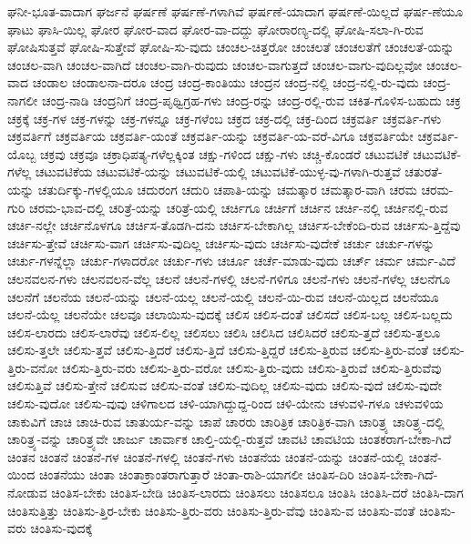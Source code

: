 {ಘನೀ-ಭೂತ-ವಾದಾಗ
ಘರ್ಜನೆ
ಘರ್ಷಣೆ
ಘರ್ಷಣೆ-ಗಳಾಗಿವೆ
ಘರ್ಷಣೆ-ಯಾದಾಗ
ಘರ್ಷಣೆ-ಯಿಲ್ಲದೆ
ಘರ್ಷ-ಣೆಯೂ
ಘಾಟು
ಘಾಸಿ-ಯಿಲ್ಲ
ಘೋರ
ಘೋರ-ವಾದ
ಘೋರ-ವಾ-ದದ್ದು
ಘೋರಾರಣ್ಯ-ದಲ್ಲಿ
ಘೋಷಿ-ಸಲಾ-ಗಿ-ರುವ
ಘೋಷಿಸುತ್ತವೆ
ಘೋಷಿ-ಸುತ್ತೇವೆ
ಘೋಷಿ-ಸು-ವುದು
ಚಂಚಲ-ಚಿತ್ತರೋ
ಚಂಚಲತೆ
ಚಂಚಲತೆಗೆ
ಚಂಚಲತೆ-ಯನ್ನು
ಚಂಚಲ-ವಾಗಿ
ಚಂಚಲ-ವಾಗಿದೆ
ಚಂಚಲ-ವಾಗಿ-ರುವುದು
ಚಂಚಲ-ವಾಗುತ್ತದೆ
ಚಂಚಲ-ವಾಗು-ವುದಿಲ್ಲವೋ
ಚಂಚಲ-ವಾದ
ಚಂಡಾಲ
ಚಂಡಾಲನಾ-ದರೂ
ಚಂದ್ರ
ಚಂದ್ರ-ಕಾಂತಿಯು
ಚಂದ್ರನ
ಚಂದ್ರ-ನಲ್ಲಿ
ಚಂದ್ರ-ನಲ್ಲಿ-ರು-ವುದು
ಚಂದ್ರ-ನಾಗಲೀ
ಚಂದ್ರ-ನಾಡಿ
ಚಂದ್ರನಿಗೆ
ಚಂದ್ರ-ಪೃಥ್ವಿಗ್ರಹ-ಗಳು
ಚಂದ್ರ-ರನ್ನು
ಚಂದ್ರ-ರಲ್ಲಿ-ರುವ
ಚಕಿತ-ಗೊಳಿಸ-ಬಹುದು
ಚಕ್ರ
ಚಕ್ರಕ್ಕೆ
ಚಕ್ರ-ಗಳ
ಚಕ್ರ-ಗಳನ್ನು
ಚಕ್ರ-ಗಳನ್ನೂ
ಚಕ್ರ-ಗಳೆಂಬ
ಚಕ್ರದ
ಚಕ್ರ-ದಲ್ಲಿ
ಚಕ್ರ-ದಿಂದ
ಚಕ್ರವರ್ತಿ
ಚಕ್ರವರ್ತಿ-ಗಳು
ಚಕ್ರವರ್ತಿಗೆ
ಚಕ್ರವರ್ತಿಯ
ಚಕ್ರವರ್ತಿ-ಯಂತೆ
ಚಕ್ರವರ್ತಿ-ಯನ್ನು
ಚಕ್ರವರ್ತಿ-ಯ-ವರೆ-ವಿಗೂ
ಚಕ್ರವರ್ತಿಯೇ
ಚಕ್ರವರ್ತಿ-ಯೊಬ್ಬ
ಚಕ್ರವು
ಚಕ್ರವೂ
ಚಕ್ರಾಧಿಪತ್ಯ-ಗಳೆಲ್ಲಕ್ಕಿಂತ
ಚಕ್ಷು-ಗಳಿಂದ
ಚಕ್ಷು-ಗಳು
ಚಚ್ಚಿ-ಕೊಂಡರೆ
ಚಟುವಟಿಕೆ
ಚಟುವಟಿಕೆ-ಗಳೆಲ್ಲ
ಚಟುವಟಿಕೆಯ
ಚಟುವಟಿಕೆ-ಯನ್ನು
ಚಟುವಟಿಕೆ-ಯಲ್ಲಿ
ಚಟುವಟಿಕೆ-ಯುಳ್ಳ-ವು-ಗಳಾಗಿ-ರುತ್ತವೆ
ಚತುರತೆ-ಯನ್ನು
ಚತುರ್ದಿಕ್ಕು-ಗಳಲ್ಲಿಯೂ
ಚದುರಂಗ
ಚದುರಿ
ಚಪಾತಿ-ಯನ್ನು
ಚಮತ್ಕಾರ
ಚಮತ್ಕಾರ-ವಾಗಿ
ಚರಮ
ಚರಮ-ಗುರಿ
ಚರಮ-ಭಾವ-ದಲ್ಲಿ
ಚರಿತ್ರೆ-ಯನ್ನು
ಚರಿತ್ರೆ-ಯಲ್ಲಿ
ಚರ್ಚಿಗೂ
ಚರ್ಚಿಗೆ
ಚರ್ಚಿನ
ಚರ್ಚಿ-ನಲ್ಲಿ
ಚರ್ಚಿನಲ್ಲಿ-ರುವ
ಚರ್ಚಿ-ನಲ್ಲೇ
ಚರ್ಚಿನೊಳಗೂ
ಚರ್ಚಿಸ-ತೊಡಗಿ-ದನು
ಚರ್ಚಿಸ-ಬೇಕಾಗಿಲ್ಲ
ಚರ್ಚಿಸ-ಬೇಕೆಂದಿ-ರುವ
ಚರ್ಚಿಸು-ತ್ತಿದ್ದೆವು
ಚರ್ಚಿಸು-ತ್ತೇವೆ
ಚರ್ಚಿಸು-ವಾಗ
ಚರ್ಚಿಸು-ವುದಿಲ್ಲ
ಚರ್ಚಿಸು-ವುದು
ಚರ್ಚಿಸು-ವುದೇಕೆ
ಚರ್ಚು
ಚರ್ಚು-ಗಳನ್ನು
ಚರ್ಚು-ಗಳನ್ನೆಲ್ಲಾ
ಚರ್ಚು-ಗಳಾದರೋ
ಚರ್ಚು-ಗಳು
ಚರ್ಚೂ
ಚರ್ಚೆ-ಮಾಡು-ವುದು
ಚರ್ಚ್
ಚರ್ಮ
ಚರ್ಮ-ವಿದೆ
ಚಲನವಲನ-ಗಳು
ಚಲನವಲನ-ವೆಲ್ಲ
ಚಲನೆ
ಚಲನೆ-ಗಳಲ್ಲಿ
ಚಲನೆ-ಗಳಿಗೂ
ಚಲನೆ-ಗಳು
ಚಲನೆ-ಗಳೆಲ್ಲ
ಚಲನೆಗೂ
ಚಲನೆಗೆ
ಚಲನೆಯ
ಚಲನೆ-ಯನ್ನು
ಚಲನೆ-ಯಲ್ಲ
ಚಲನೆ-ಯಲ್ಲಿ
ಚಲನೆ-ಯಿ-ರುವ
ಚಲನೆ-ಯಿಲ್ಲದ
ಚಲನೆಯೂ
ಚಲನೆ-ಯೆಲ್ಲ
ಚಲನೆಯೇ
ಚಲವೂ
ಚಲಾಯಿಸು-ವುದಕ್ಕೆ
ಚಲಿಸ
ಚಲಿಸ-ದಂತೆ
ಚಲಿಸದೆ
ಚಲಿಸ-ಬಲ್ಲ
ಚಲಿಸ-ಬಲ್ಲದು
ಚಲಿಸ-ಲಾರದು
ಚಲಿಸ-ಲಾರೆವು
ಚಲಿಸ-ಲಿಲ್ಲ
ಚಲಿಸಲು
ಚಲಿಸಿ
ಚಲಿಸಿದ
ಚಲಿಸಿದರೆ
ಚಲಿಸು-ತ್ತದೆ
ಚಲಿಸು-ತ್ತಲೂ
ಚಲಿಸು-ತ್ತಲೇ
ಚಲಿಸು-ತ್ತವೆ
ಚಲಿಸು-ತ್ತಿದರೆ
ಚಲಿಸು-ತ್ತಿದೆ
ಚಲಿಸು-ತ್ತಿದ್ದರೆ
ಚಲಿಸು-ತ್ತಿರುವ
ಚಲಿಸು-ತ್ತಿರು-ವಂತೆ
ಚಲಿಸು-ತ್ತಿರು-ವನೋ
ಚಲಿಸು-ತ್ತಿರು-ವರು
ಚಲಿಸು-ತ್ತಿರು-ವರೋ
ಚಲಿಸು-ತ್ತಿರು-ವುದು
ಚಲಿಸು-ತ್ತಿರುವೆ
ಚಲಿಸು-ತ್ತಿರುವೆವು
ಚಲಿಸುತ್ತಿವೆ
ಚಲಿಸು-ತ್ತೇನೆ
ಚಲಿಸುವ
ಚಲಿಸು-ವಂತೆ
ಚಲಿಸು-ವುದಿಲ್ಲ
ಚಲಿಸು-ವುದು
ಚಲಿಸು-ವುದೆ
ಚಲಿಸು-ವುದೇ
ಚಲಿಸು-ವುದೋ
ಚಲಿಸು-ವುವು
ಚಳಿಗಾಲದ
ಚಳಿ-ಯಾಗಿದ್ದುದ್ದ-ರಿಂದ
ಚಳಿ-ಯೇನು
ಚಳುವಳಿ-ಗಳೂ
ಚಳುವಳಿಯ
ಚಾಕುವಿಗೆ
ಚಾಚಿ
ಚಾಚಿ-ರುವ
ಚಾತುರ್ಯ-ವನ್ನು
ಚಾಪೆ
ಚಾರರು
ಚಾರಿತ್ರಿಕ
ಚಾರಿತ್ರಿಕ-ವಾಗಿ
ಚಾರಿತ್ರ್ಯ
ಚಾರಿತ್ರ್ಯ-ದಲ್ಲಿ
ಚಾರಿತ್ರ್ಯ-ವನ್ನು
ಚಾರಿತ್ರ್ಯವೇ
ಚಾರ್ಜು
ಚಾರ್ವಾಕ
ಚಾಲ್ತಿ-ಯಲ್ಲಿ-ರುತ್ತವೆ
ಚಾವಟಿ
ಚಾವಟಿಯ
ಚಿಂತಕರಾಗ-ಬೇಕಾ-ಗಿದೆ
ಚಿಂತನ
ಚಿಂತನೆ
ಚಿಂತನೆ-ಗಳ
ಚಿಂತನೆ-ಗಳಲ್ಲಿ
ಚಿಂತನೆ-ಗಳು
ಚಿಂತನೆಯ
ಚಿಂತನೆ-ಯನ್ನು
ಚಿಂತನೆ-ಯಲ್ಲಿ
ಚಿಂತನೆ-ಯಿಂದ
ಚಿಂತನೆಯು
ಚಿಂತಾ
ಚಿಂತಾಕ್ರಾಂತರಾಗುತ್ತಾರೆ
ಚಿಂತಾ-ರಾಶಿ-ಯಾಗಲೀ
ಚಿಂತಿಸ-ದಿರಿ
ಚಿಂತಿಸ-ಬೇಕಾ-ಗಿದೆ-ನೋಡುವ
ಚಿಂತಿಸ-ಬೇಕು
ಚಿಂತಿಸ-ಬೇಡಿ
ಚಿಂತಿಸ-ಲಾರದು
ಚಿಂತಿಸಲು
ಚಿಂತಿಸಲೂ
ಚಿಂತಿಸಿ
ಚಿಂತಿಸಿ-ದರೆ
ಚಿಂತಿಸಿ-ದಾಗ
ಚಿಂತಿಸುತ್ತಿತ್ತು
ಚಿಂತಿಸು-ತ್ತಿರ-ಬೇಕು
ಚಿಂತಿಸು-ತ್ತಿರು-ವರು
ಚಿಂತಿಸು-ತ್ತಿರು-ವೆವು
ಚಿಂತಿಸು-ವ
ಚಿಂತಿಸು-ವಂತೆ
ಚಿಂತಿಸು-ವರು
ಚಿಂತಿಸು-ವುದಕ್ಕೆ
}

